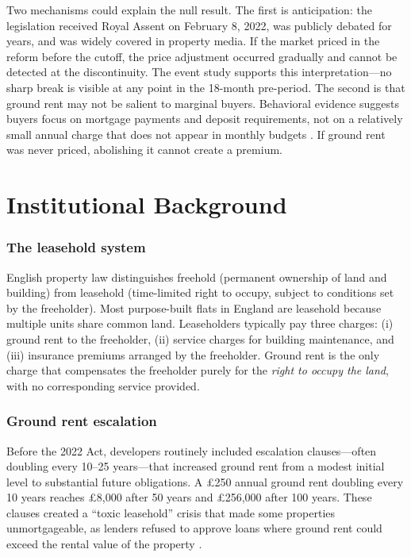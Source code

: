 \documentclass[12pt]{article}
\begin{document}
Two mechanisms could explain the null result. The first is anticipation: the legislation received Royal Assent on February 8, 2022, was publicly debated for years, and was widely covered in property media. If the market priced in the reform before the cutoff, the price adjustment occurred gradually and cannot be detected at the discontinuity. The event study supports this interpretation---no sharp break is visible at any point in the 18-month pre-period. The second is that ground rent may not be salient to marginal buyers. Behavioral evidence suggests buyers focus on mortgage payments and deposit requirements, not on a relatively small annual charge that does not appear in monthly budgets \citep{thaler1999mental}. If ground rent was never priced, abolishing it cannot create a premium.

\section{Institutional Background}

\subsubsection*{The leasehold system} English property law distinguishes freehold (permanent ownership of land and building) from leasehold (time-limited right to occupy, subject to conditions set by the freeholder). Most purpose-built flats in England are leasehold because multiple units share common land. Leaseholders typically pay three charges: (i) ground rent to the freeholder, (ii) service charges for building maintenance, and (iii) insurance premiums arranged by the freeholder. Ground rent is the only charge that compensates the freeholder purely for the \textit{right to occupy the land}, with no corresponding service provided.

\subsubsection*{Ground rent escalation} Before the 2022 Act, developers routinely included escalation clauses---often doubling every 10--25 years---that increased ground rent from a modest initial level to substantial future obligations. A \pounds 250 annual ground rent doubling every 10 years reaches \pounds 8,000 after 50 years and \pounds 256,000 after 100 years. These clauses created a ``toxic leasehold'' crisis that made some properties unmortgageable, as lenders refused to approve loans where ground rent could exceed the rental value of the property \citep{mhclg2017}.
\end{document}
